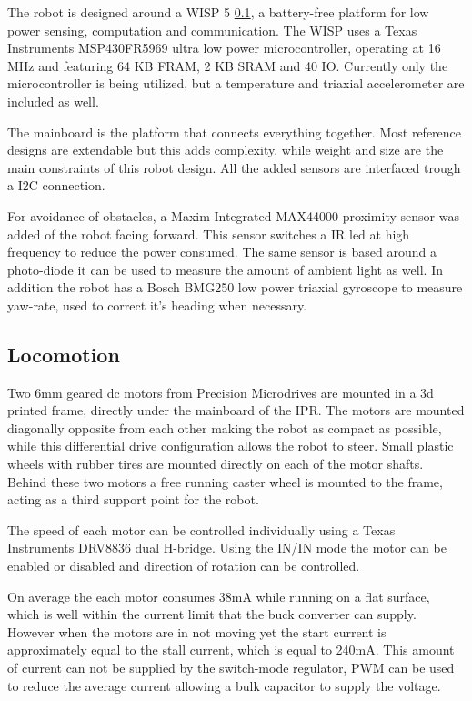 The robot is designed around a WISP 5 \ref{}, a battery-free platform for low power sensing, computation and communication.
The WISP uses a Texas Instruments MSP430FR5969 ultra low power microcontroller, operating at 16 MHz and featuring 64 KB FRAM, 2 KB SRAM and 40 IO. 
Currently only the microcontroller is being utilized, but a temperature and triaxial accelerometer are included as well. %



The mainboard is the platform that connects everything together.
Most reference designs are extendable but this adds complexity, while weight and size are the main constraints of this robot design.
All the added sensors are interfaced trough a I2C connection.

For avoidance of obstacles, a Maxim Integrated MAX44000 proximity sensor was added of the robot facing forward.
This sensor switches a IR led at high frequency to reduce the power consumed.
The same sensor is based around a photo-diode it can be used to measure the amount of ambient light as well.
In addition the robot has a Bosch BMG250 low power triaxial gyroscope to measure yaw-rate, used to correct it's heading when necessary.

\subsection{Locomotion}

Two 6mm geared dc motors from Precision Microdrives are mounted in a 3d printed frame, directly under the mainboard of the IPR.
The motors are mounted diagonally opposite from each other making the robot as compact as possible, while this differential drive configuration allows the robot to steer.
Small plastic wheels with rubber tires are mounted directly on each of the motor shafts.
Behind these two motors a free running caster wheel is mounted to the frame, acting as a third support point for the robot.

The speed of each motor can be controlled individually using a Texas Instruments DRV8836 dual H-bridge.
Using the IN/IN mode the motor can be enabled or disabled and direction of rotation can be controlled.


% 
On average the each motor consumes 38mA while running on a flat surface, which is well within the current limit that the buck converter can supply.
However when the motors are in not moving yet the start current is approximately equal to the stall current, which is equal to 240mA.
This amount of current can not be supplied by the switch-mode regulator, PWM can be used to reduce the average current allowing a bulk capacitor to supply the voltage.

